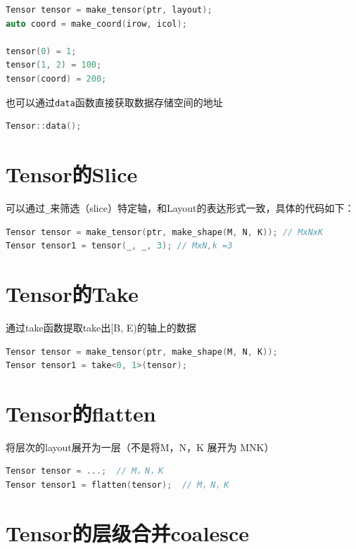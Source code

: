 \begin{lstlisting}[language=C++]
Tensor tensor = make_tensor(ptr, layout);
auto coord = make_coord(irow, icol);

tensor(0) = 1;
tensor(1, 2) = 100;
tensor(coord) = 200;
\end{lstlisting}

也可以通过\verb|data|函数直接获取数据存储空间的地址

\begin{lstlisting}[language=C++]
Tensor::data();
\end{lstlisting}

\section{Tensor的Slice}

可以通过\verb|_|来筛选（slice）特定轴，和Layout的表达形式一致，具体的代码如下：

\begin{lstlisting}[language=C++]
Tensor tensor = make_tensor(ptr, make_shape(M, N, K)); // MxNxK
Tensor tensor1 = tensor(_, _, 3); // MxN,k =3
\end{lstlisting}

\section{Tensor的Take}

通过take函数提取take出[B, E)的轴上的数据

\begin{lstlisting}[language=C++]
Tensor tensor = make_tensor(ptr, make_shape(M, N, K));
Tensor tensor1 = take<0, 1>(tensor);
\end{lstlisting}

\section{Tensor的flatten}

将层次的layout展开为一层（不是将M，N，K 展开为 MNK）

\begin{lstlisting}[language=C++]
Tensor tensor = ...;  // M，N，K
Tensor tensor1 = flatten(tensor);  // M，N，K
\end{lstlisting}

\section{Tensor的层级合并coalesce}

